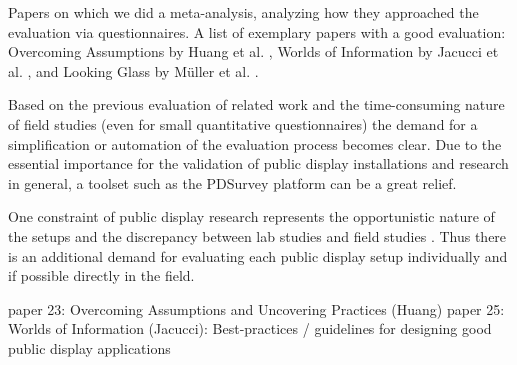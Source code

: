 	Papers on which we did a meta-analysis, analyzing how they approached the evaluation via questionnaires. A list of exemplary papers with a good evaluation: Overcoming Assumptions by Huang et al. \cite{huang2008overcoming}, Worlds of Information by Jacucci et al. \cite{jacucci2010worldsofinformation}, and Looking Glass by M{\"u}ller et al. \cite{Muller2012LookingGlass}.




	Based on the previous evaluation of related work and the time-consuming nature of field studies (even for small quantitative questionnaires) the demand for a simplification or automation of the evaluation process becomes clear. Due to the essential importance for the validation of public display installations and research in general, a toolset such as the PDSurvey platform can be a great relief. 

	One constraint of public display research represents the opportunistic nature of the setups and the discrepancy between lab studies and field studies \cite{Ojala2011}. Thus there is an additional demand for evaluating each public display setup individually and if possible directly in the field.





		paper 23: Overcoming Assumptions and Uncovering Practices (Huang)
		paper 25: Worlds of Information (Jacucci): Best-practices / guidelines for designing good public display applications





